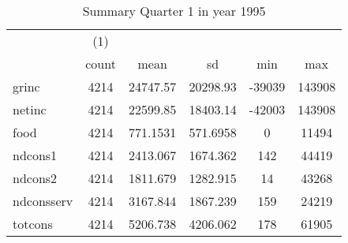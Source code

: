 \begin{table}[htbp]\centering
\def\sym#1{\ifmmode^{#1}\else\(^{#1}\)\fi}
\caption{Summary Quarter 1 in year 1995 \label{sum\_Q1\_y1995}}
\begin{tabular}{l*{1}{ccccc}}
\hline\hline
            &\multicolumn{1}{c}{(1)}&            &            &            &            \\
            &       count&        mean&          sd&         min&         max\\
\hline
grinc       &        4214&    24747.57&    20298.93&      -39039&      143908\\
netinc      &        4214&    22599.85&    18403.14&      -42003&      143908\\
food        &        4214&    771.1531&    571.6958&           0&       11494\\
ndcons1     &        4214&    2413.067&    1674.362&         142&       44419\\
ndcons2     &        4214&    1811.679&    1282.915&          14&       43268\\
ndconsserv  &        4214&    3167.844&    1867.239&         159&       24219\\
totcons     &        4214&    5206.738&    4206.062&         178&       61905\\
\hline\hline
\end{tabular}
\end{table}
